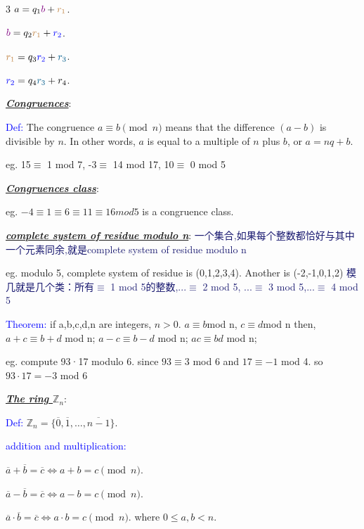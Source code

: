 \documentclass[12pt]{article}
\newcommand{\bulletPoint}[1]{\underline{\textit{\textbf{#1}}}}
\begin{document}
\begin{multicols*}{3}
$a=q_1\textcolor{violet}{b}+ \textcolor{brown}{r_1}$.        

$\textcolor{violet}{b}=q_2\textcolor{brown}{r_1}+ \textcolor{blue}{r_2}$.        

$\textcolor{brown}{r_1}=q_3\textcolor{blue}{r_2}+\textcolor{MidnightBlue}{r_3}$.      

$\textcolor{blue}{r_2} =q_4\textcolor{MidnightBlue}{r_3}+r_4$.      



\bulletPoint{Congruences}:

\textcolor{blue}{Def:} The congruence $a \equiv b \pmod n$ means that the difference $(a-b)$ is divisible by $n$.
In other words, $a$ is equal to a multiple of $n$ plus $b$, or $a = nq + b. $

eg. 15$\equiv$ 1 mod 7, -3$\equiv$ 14 mod 17, 10$\equiv$ 0 mod 5

\bulletPoint{Congruences class}:

eg. $-4\equiv1 \equiv6\equiv11\equiv16 mod 5$ is a congruence class.

\bulletPoint{complete system of residue modulo n}:
{\fontsize{5.5pt}{5pt}\selectfont\textcolor{ MidnightBlue}{一个集合,如果每个整数都恰好与其中一个元素同余,就是complete system of residue modulo n}}

eg. modulo 5, complete system of  residue is {(0,1,2,3,4)}. Another is {(-2,-1,0,1,2)}  {\fontsize{5.5pt}{5pt}\selectfont\textcolor{MidnightBlue}{模几就是几个类：所有$\equiv$ 1 mod 5的整数,...$\equiv$ 2 mod 5, ...$\equiv$ 3 mod 5,...$\equiv$ 4 mod 5}}

\textcolor{blue}{Theorem:} if a,b,c,d,n are integers, $n>0$. $a\equiv b $mod n, $c\equiv d $mod n then, $a+c \equiv b+d$ mod n; $a-c \equiv b-d$ mod n; $ac \equiv bd$ mod n;

eg. compute 93·17 modulo 6. since $93\equiv 3$ mod 6 and $17\equiv-1$ mod 4. so $93·17=-3$ mod 6 

\bulletPoint{The ring $\mathbb{Z}_n$}:

\textcolor{blue}{Def:} $\mathbb{Z}_n = \{\overline{0}, \overline{1}, \ldots, \overline{n-1}\}.$

\textcolor{blue}{addition and multiplication:} 

$\overline{a}+\overline{b}=\overline{c} \Longleftrightarrow a+b=c \pmod n.$


$\overline{a}-\overline{b}=\overline{c} \Longleftrightarrow a-b=c \pmod n.$

$\overline{a}\cdot\overline{b}=\overline{c} \Longleftrightarrow a\cdot b=c \pmod n.$ where $0 \leq a,b<n$.


\end{multicols*}
\end{document}
